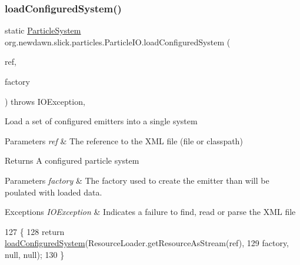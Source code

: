 \subsubsection{\texorpdfstring{load\+Configured\+System()}{loadConfiguredSystem()}\hspace{0.1cm}{\footnotesize\ttfamily [6/9]}}
{\footnotesize\ttfamily static \mbox{\hyperlink{classorg_1_1newdawn_1_1slick_1_1particles_1_1_particle_system}{Particle\+System}} org.\+newdawn.\+slick.\+particles.\+Particle\+I\+O.\+load\+Configured\+System (\begin{DoxyParamCaption}\item[{String}]{ref,  }\item[{\mbox{\hyperlink{interfaceorg_1_1newdawn_1_1slick_1_1particles_1_1_configurable_emitter_factory}{Configurable\+Emitter\+Factory}}}]{factory }\end{DoxyParamCaption}) throws I\+O\+Exception\hspace{0.3cm}{\ttfamily [inline]}, {\ttfamily [static]}}

Load a set of configured emitters into a single system


\begin{DoxyParams}{Parameters}
{\em ref} & The reference to the X\+ML file (file or classpath) \\
\hline
\end{DoxyParams}
\begin{DoxyReturn}{Returns}
A configured particle system 
\end{DoxyReturn}

\begin{DoxyParams}{Parameters}
{\em factory} & The factory used to create the emitter than will be poulated with loaded data. \\
\hline
\end{DoxyParams}

\begin{DoxyExceptions}{Exceptions}
{\em I\+O\+Exception} & Indicates a failure to find, read or parse the X\+ML file \\
\hline
\end{DoxyExceptions}

\begin{DoxyCode}
127                                                                    \{
128         \textcolor{keywordflow}{return} \mbox{\hyperlink{classorg_1_1newdawn_1_1slick_1_1particles_1_1_particle_i_o_a1da2bcc8784c9cf967326954bc3c9d33}{loadConfiguredSystem}}(ResourceLoader.getResourceAsStream(ref),
129             factory, null, null);
130     \}
\end{DoxyCode}
\mbox{\label{classorg_1_1newdawn_1_1slick_1_1particles_1_1_particle_i_o_a9a2fae7cc5f4a60763c9f223fad8d0ab}} 
